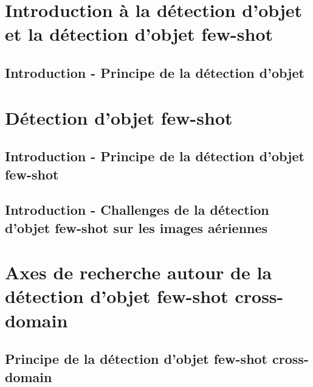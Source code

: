 \documentclass[xcolor=table, 8pt]{beamer}
\begin{document}
    \maketitle
    


    \section{Introduction à la détection d'objet et la détection d'objet few-shot}\label{sec:od-fsod}

    \subsection{Introduction - Principe de la détection d'objet}\label{subsec:object-detection}
    


    \section{Détection d'objet few-shot}\label{sec:fs-od-fsod}

    \subsection{Introduction - Principe de la détection d'objet few-shot}\label{subsec:fs-od-definition}
    

    \subsection{Introduction - Challenges de la détection d'objet few-shot sur les images aériennes}\label{sec:fs-od-challenges}
    
%    

    \section{Axes de recherche autour de la détection d'objet few-shot cross-domain}\label{subsec:fs-od-cd}
    \subsection{Principe de la détection d'objet few-shot cross-domain}\label{subsec:fs-od-cd-principle}
    
\end{document}
